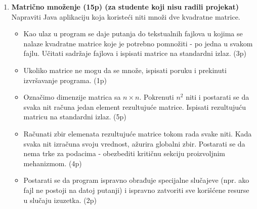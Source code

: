 \documentclass[]{article}
\begin{document}
\begin{enumerate}

   \item \textbf{Matrično množenje (15p) (za studente koji nisu radili projekat)}
  \\ Napraviti Java aplikaciju koja koristeći niti množi dve kvadratne matrice.
  \begin{itemize}
    \item Kao ulaz u program se daje putanja do tekstualnih fajlova u kojima se nalaze kvadratne matrice koje je potrebno pomnožiti - po jedna u svakom fajlu. Učitati sadržaje fajlova i ispisati matrice na standardni izlaz. \hfill (3p)
    \item Ukoliko matrice ne mogu da se množe, ispisati poruku i prekinuti izvršavanje programa. \hfill (1p)
    \item Označimo dimenzije matrica sa $n \times n$. Pokrenuti $n^2$ niti i postarati se da svaka nit računa jedan element rezultujuće matrice. Ispisati rezultujuću matricu na standardni izlaz. \hfill (5p)
    \item Računati zbir elemenata rezultujuće matrice tokom rada svake niti. Kada svaka nit izračuna svoju vrednost, ažurira globalni zbir. Postarati se da nema trke za podacima - obezbediti kritičnu sekciju proizvoljnim mehanizmom. \hfill (4p)
    \item Postarati se da program ispravno obrađuje specijalne slučajeve (npr. ako fajl ne postoji na datoj putanji) i ispravno zatvoriti sve korišćene resurse u slučaju izuzetka. \hfill (2p)
  \end{itemize}

\vspace{15pt}


\end{enumerate}
\end{document}
